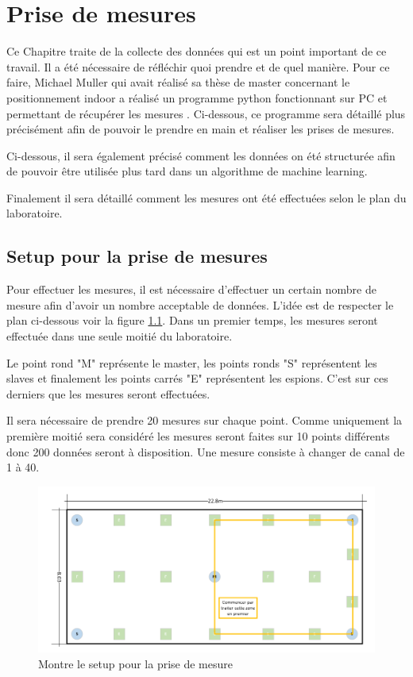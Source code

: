 \chapter{Prise de mesures}
Ce Chapitre traite de la collecte des données qui est un point important de ce travail. Il a été nécessaire de réfléchir quoi prendre et de quel manière. Pour ce faire, Michael Muller qui avait réalisé sa thèse de master concernant le positionnement indoor a réalisé un programme python fonctionnant sur PC et permettant de récupérer les mesures \cite{MIC}. Ci-dessous, ce programme sera détaillé plus précisément afin de pouvoir le prendre en main et réaliser les prises de mesures. 

Ci-dessous, il sera également précisé comment les données on été structurée afin de pouvoir être utilisée plus tard dans un algorithme de machine learning. 

Finalement il sera détaillé comment les mesures ont été effectuées selon le plan du laboratoire.

\section{Setup pour la prise de mesures}
Pour effectuer les mesures, il est nécessaire d'effectuer un certain nombre de mesure afin d'avoir un nombre acceptable de données. L'idée est de respecter le plan ci-dessous voir la figure \ref{fig:PlanMod}. Dans un premier temps, les mesures seront effectuée dans une seule moitié du laboratoire. 

Le point rond "M" représente le master, les points ronds "S" représentent les slaves et finalement les points carrés "E" représentent les espions. C'est sur ces derniers que les mesures seront effectuées. 

Il sera nécessaire de prendre 20 mesures sur chaque point. Comme uniquement la première moitié sera considéré les mesures seront faites sur 10 points différents donc 200 données seront à disposition. Une mesure consiste à changer de canal de 1 à 40.

\begin{figure}[htp]
	\begin{center}
		\includegraphics[scale=0.5]{figures/PlanMod.PNG}
		\caption{Montre le setup pour la prise de mesure}
		\label{fig:PlanMod} %
	\end{center}
\end{figure}

